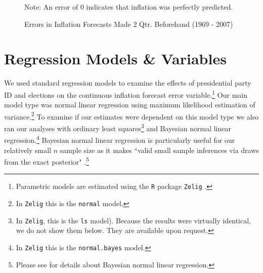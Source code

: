 \documentclass[a4paper]{article}
\makeatletter
\newenvironment{kframe}{%
 \def\at@end@of@kframe{}%
 \ifinner\ifhmode%
  \def\at@end@of@kframe{\end{minipage}}%
  \begin{minipage}{\columnwidth}%
 \fi\fi%
 \def\FrameCommand##1{\hskip\@totalleftmargin \hskip-\fboxsep
 \colorbox{shadecolor}{##1}\hskip-\fboxsep
     \hskip-\linewidth \hskip-\@totalleftmargin \hskip\columnwidth}%
 \MakeFramed {\advance\hsize-\width
   \@totalleftmargin\z@ \linewidth\hsize
   \@setminipage}}%
 {\par\unskip\endMakeFramed%
 \at@end@of@kframe}
\newenvironment{knitrout}{}{} %
\makeatother
\begin{document}
\begin{figure}[t]
    \caption{Errors in Inflation Forecasts Made 2 Qtr. Beforehand (1969 - 2007)}
    \label{errors_over_time}
    \begin{center}
    
\begin{knitrout}
\color{fgcolor}\begin{kframe}


{\ttfamily\noindent\bfseries\color{errorcolor}{\#\# Error: there is no package called 'ggplot2'}}\end{kframe}
\end{knitrout}

    
    \end{center}
    \begin{singlespace}
        {\scriptsize{Note: An error of 0 indicates that inflation was perfectly predicted.}}
    \end{singlespace}
\end{figure}




\section{Regression Models \& Variables}

We used standard regression models to examine the effects of presidential party ID and elections on the continuous inflation forecast error variable.\footnote{Parametric models are estimated using the \texttt{R} package \texttt{Zelig} \citep{Zelig2012}.} Our main model type was normal linear regression using maximum likelihood estimation of variance.\footnote{In {\tt{Zelig}} this is the {\tt{normal}} model.} To examine if our estimates were dependent on this model type we also ran our analyses with ordinary least squares\footnote{In \texttt{Zelig}, this is the \texttt{ls} model). Because the results were virtually identical, we do not show them below. They are available upon request.} and Bayesian normal linear regression.\footnote{In {\tt{Zelig}} this is the {\tt{normal.bayes}} model.} Bayesian normal linear regression is particularly useful for our relatively small $n$ sample size as it makes ``valid small sample inferences via draws from the exact posterior" \citep[][38]{Zelig2012}.\footnote{Please see \cite{Goodrich2007} for details about Bayesian normal linear regression.} 
\end{document}
